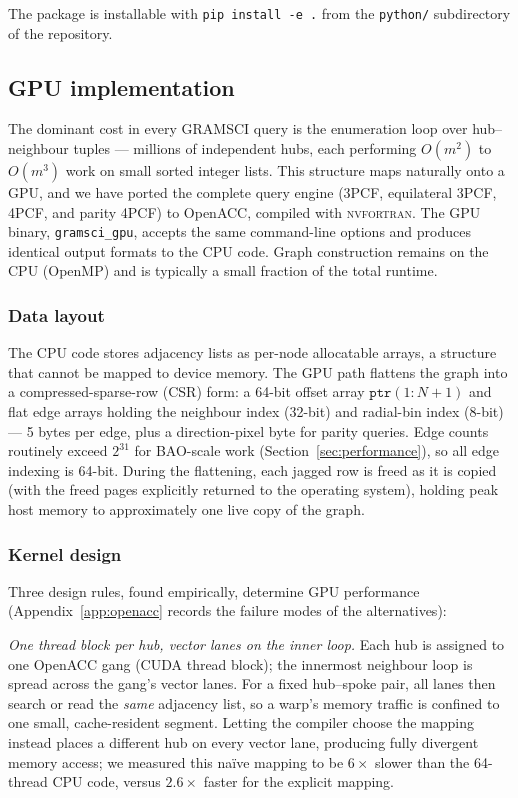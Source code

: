 \documentclass[twocolumn]{aastex701}
\begin{document}
The package is installable with \texttt{pip install -e .} from the
\texttt{python/} subdirectory of the repository.

\subsection{GPU implementation}
\label{sec:gpu}

The dominant cost in every GRAMSCI query is the enumeration loop over
hub--neighbour tuples --- millions of independent hubs, each performing
$O(m^2)$ to $O(m^3)$ work on small sorted integer lists.  This structure
maps naturally onto a GPU, and we have ported the complete query engine
(3PCF, equilateral 3PCF, 4PCF, and parity 4PCF) to OpenACC, compiled with
\textsc{nvfortran}.  The GPU binary, \texttt{gramsci\_gpu}, accepts the
same command-line options and produces identical output formats to the CPU
code.  Graph construction remains on the CPU (OpenMP) and is typically a
small fraction of the total runtime.

\subsubsection{Data layout}
\label{sec:csr}

The CPU code stores adjacency lists as per-node allocatable arrays, a
structure that cannot be mapped to device memory.  The GPU path flattens
the graph into a compressed-sparse-row (CSR) form: a 64-bit offset array
$\mathtt{ptr}(1{:}N{+}1)$ and flat edge arrays holding the neighbour index
(32-bit) and radial-bin index (8-bit) --- 5 bytes per edge, plus a
direction-pixel byte for parity queries.  Edge counts routinely exceed
$2^{31}$ for BAO-scale work (Section~\ref{sec:performance}), so all edge
indexing is 64-bit.  During the flattening, each jagged row is freed as it
is copied (with the freed pages explicitly returned to the operating
system), holding peak host memory to approximately one live copy of the
graph.

\subsubsection{Kernel design}
\label{sec:kernels}

Three design rules, found empirically, determine GPU performance
(Appendix~\ref{app:openacc} records the failure modes of the alternatives):

\textit{One thread block per hub, vector lanes on the inner loop.}  Each
hub is assigned to one OpenACC gang (CUDA thread block); the innermost
neighbour loop is spread across the gang's vector lanes.  For a fixed
hub--spoke pair, all lanes then search or read the \emph{same} adjacency
list, so a warp's memory traffic is confined to one small, cache-resident
segment.  Letting the compiler choose the mapping instead places a
different hub on every vector lane, producing fully divergent memory
access; we measured this na\"ive mapping to be $6\times$ slower than the
64-thread CPU code, versus $2.6\times$ faster for the explicit mapping.
\end{document}
